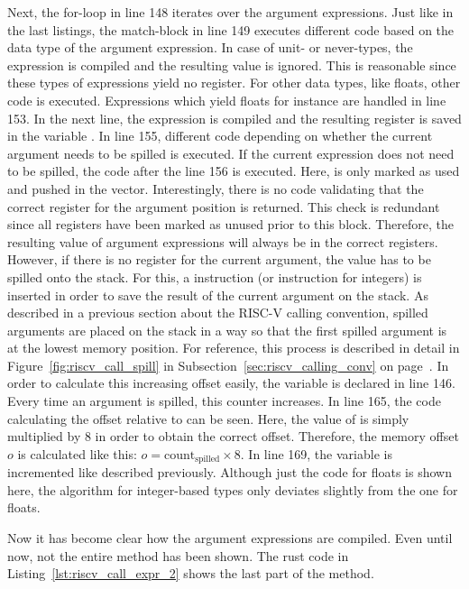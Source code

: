 Next, the for-loop in line 148 iterates over the argument expressions.
Just like in the last listings, the match-block in line 149 executes different code based on the data type of the argument expression.
In case of unit- or never-types, the expression is compiled and the resulting value is ignored.
This is reasonable since these types of expressions yield no register.
For other data types, like floats, other code is executed.
Expressions which yield floats for instance are handled in line 153.
In the next line, the expression is compiled and the resulting register is saved in the variable .
In line 155, different code depending on whether the current argument needs to be spilled is executed.
If the current expression does not need to be spilled, the code after the line 156 is executed.
Here,  is only marked as used and pushed in the  vector.
Interestingly, there is no code validating that the correct register for the argument position is returned.
This check is redundant since all registers have been marked as unused prior to this block.
Therefore, the resulting value of argument expressions will always be in the correct registers.
However, if there is no register for the current argument, the value has to be spilled onto the stack.
For this, a  instruction (or  instruction for integers) is inserted in order to save the result of the current argument on the stack.
As described in a previous section about the RISC-V calling convention, spilled arguments are placed on the stack in a way so that the first spilled argument is at the lowest memory position.
For reference, this process is described in detail in Figure~\ref{fig:riscv_call_spill} in Subsection~\ref{sec:riscv_calling_conv} on page~\pageref{sec:riscv_calling_conv}.
In order to calculate this increasing offset easily, the  variable is declared in line 146.
Every time an argument is spilled, this counter increases.
In line 165, the code calculating the offset relative to  can be seen.
Here, the value of  is simply multiplied by 8 in order to obtain the correct offset.
Therefore, the memory offset $o$ is calculated like this: $o = \text{count}_\text{spilled} \times 8$.
In line 169, the  variable is incremented like described previously.
Although just the code for floats is shown here, the algorithm for integer-based types only deviates slightly from the one for floats.

Now it has become clear how the argument expressions are compiled.
Even until now, not the entire method has been shown.
The rust code in Listing~\ref{lst:riscv_call_expr_2} shows the last part of the method.

